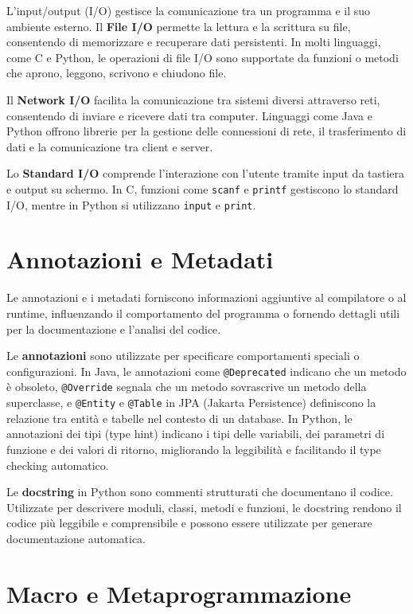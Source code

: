 \documentclass[
  letterpaper,
]{scrbook}
\begin{document}
L'input/output (I/O) gestisce la comunicazione tra un programma e il suo
ambiente esterno. Il \textbf{File I/O} permette la lettura e la
scrittura su file, consentendo di memorizzare e recuperare dati
persistenti. In molti linguaggi, come C e Python, le operazioni di file
I/O sono supportate da funzioni o metodi che aprono, leggono, scrivono e
chiudono file.

Il \textbf{Network I/O} facilita la comunicazione tra sistemi diversi
attraverso reti, consentendo di inviare e ricevere dati tra computer.
Linguaggi come Java e Python offrono librerie per la gestione delle
connessioni di rete, il trasferimento di dati e la comunicazione tra
client e server.

Lo \textbf{Standard I/O} comprende l'interazione con l'utente tramite
input da tastiera e output su schermo. In C, funzioni come
\texttt{scanf} e \texttt{printf} gestiscono lo standard I/O, mentre in
Python si utilizzano \texttt{input} e \texttt{print}.

\section{Annotazioni e Metadati}\label{annotazioni-e-metadati}

Le annotazioni e i metadati forniscono informazioni aggiuntive al
compilatore o al runtime, influenzando il comportamento del programma o
fornendo dettagli utili per la documentazione e l'analisi del codice.

Le \textbf{annotazioni} sono utilizzate per specificare comportamenti
speciali o configurazioni. In Java, le annotazioni come
\texttt{@Deprecated} indicano che un metodo è obsoleto,
\texttt{@Override} segnala che un metodo sovrascrive un metodo della
superclasse, e \texttt{@Entity} e \texttt{@Table} in JPA (Jakarta
Persistence) definiscono la relazione tra entità e tabelle nel contesto
di un database. In Python, le annotazioni dei tipi (type hint) indicano
i tipi delle variabili, dei parametri di funzione e dei valori di
ritorno, migliorando la leggibilità e facilitando il type checking
automatico.

Le \textbf{docstring} in Python sono commenti strutturati che
documentano il codice. Utilizzate per descrivere moduli, classi, metodi
e funzioni, le docstring rendono il codice più leggibile e comprensibile
e possono essere utilizzate per generare documentazione automatica.

\section{Macro e Metaprogrammazione}\label{macro-e-metaprogrammazione}
\end{document}
